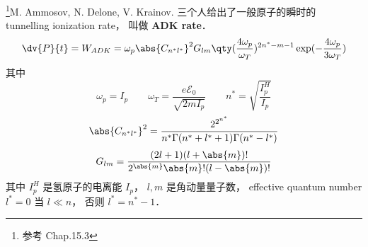 
\begin{issues}
\issueDraft
\end{issues}

\footnote{参考 \cite{Brandsen} Chap.15.3}M. Ammosov, N. Delone, V. Krainov. 三个人给出了一般原子的瞬时的 tunnelling ionization rate， 叫做 \textbf{ADK rate}．
\begin{equation}
\dv{P}{t} = W_{ADK} = \omega_p \abs{C_{n^*l^*}}^2 G_{lm}\qty(\frac{4\omega_p}{\omega_T})^{2n^*-m-1}\exp(-\frac{4\omega_p}{3\omega_T})
\end{equation}
其中
\begin{equation}
\omega_p = I_p \qquad \omega_T = \frac{e\mathcal E_0}{\sqrt{2mI_p}} \qquad
n^* = \sqrt{\frac{I_p^H}{I_p}}
\end{equation}
\begin{equation}
\abs{C_{n^*l^*}}^2 = \frac{2^{2^{n^*}}}{n^* \Gamma(n^* + l^* + 1) \Gamma(n^* - l^*)}
\end{equation}
\begin{equation}
G_{lm} = \frac{(2l+1)(l+\abs{m})!}{2^{\abs{m}}\abs{m}!(l-\abs{m})!}
\end{equation}
其中 $I_p^H$ 是氢原子的电离能 $I_p$， $l,m$ 是角动量量子数， effective quantum number $l^* = 0$ 当 $l\ll n$， 否则 $l^* = n^*-1$．